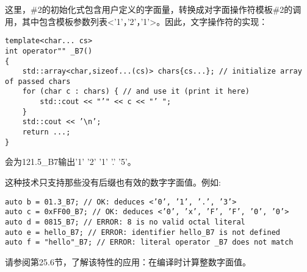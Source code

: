 这里，\#2的初始化式包含用户定义的字面量，转换成对字面操作符模板\#2的调用，其中包含模板参数列表<'1'，'2'，'1'>。因此，文字操作符的实现：

\begin{lstlisting}[style=styleCXX]
template<char... cs>
int operator"" _B7()
{
	std::array<char,sizeof...(cs)> chars{cs...}; // initialize array of passed chars
	for (char c : chars) { // and use it (print it here)
		std::cout << "’" << c << "’ ";
	}
	std::cout << ’\n’;
	return ...;
}
\end{lstlisting}

会为121.5\_B7输出'1' '2' '1' '.' '5'。

这种技术只支持那些没有后缀也有效的数字字面值。例如:

\begin{lstlisting}[style=styleCXX]
auto b = 01.3_B7; // OK: deduces <’0’, ’1’, ’.’, ’3’>
auto c = 0xFF00_B7; // OK: deduces <’0’, ’x’, ’F’, ’F’, ’0’, ’0’>
auto d = 0815_B7; // ERROR: 8 is no valid octal literal
auto e = hello_B7; // ERROR: identifier hello_B7 is not defined
auto f = "hello"_B7; // ERROR: literal operator _B7 does not match
\end{lstlisting}

请参阅第25.6节，了解该特性的应用：在编译时计算整数字面值。






















